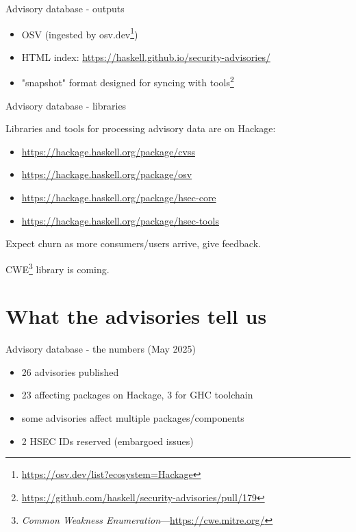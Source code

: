 \documentclass[ignorenonframetext,aspectratio=169,12pt]{beamer}
\begin{document}
\begin{frame}{Advisory database - outputs}
  \begin{itemize}
    \item OSV (ingested by
      osv.dev\footnote{\url{https://osv.dev/list?ecosystem=Hackage}})
    \item HTML index: \url{https://haskell.github.io/security-advisories/}
    \item "snapshot" format designed for syncing with
      tools\footnote{\url{https://github.com/haskell/security-advisories/pull/179}}
  \end{itemize}
\end{frame}

\begin{frame}{Advisory database - libraries}

  Libraries and tools for processing advisory data are on Hackage:

  \begin{itemize}
    \item \url{https://hackage.haskell.org/package/cvss}
    \item \url{https://hackage.haskell.org/package/osv}
    \item \url{https://hackage.haskell.org/package/hsec-core}
    \item \url{https://hackage.haskell.org/package/hsec-tools}
  \end{itemize}

  Expect churn as more consumers/users arrive, give feedback.

  CWE\footnote{{\em Common Weakness Enumeration}---\url{https://cwe.mitre.org/}} library is coming.

\end{frame}


\section{What the advisories tell us}

\begin{frame}{Advisory database - the numbers (May 2025)}
  \begin{itemize}
    \item 26 advisories published
    \item 23 affecting packages on Hackage, 3 for GHC toolchain
    \item some advisories affect multiple packages/components
    \item 2 HSEC IDs reserved (embargoed issues)
  \end{itemize}
\end{frame}
\end{document}
